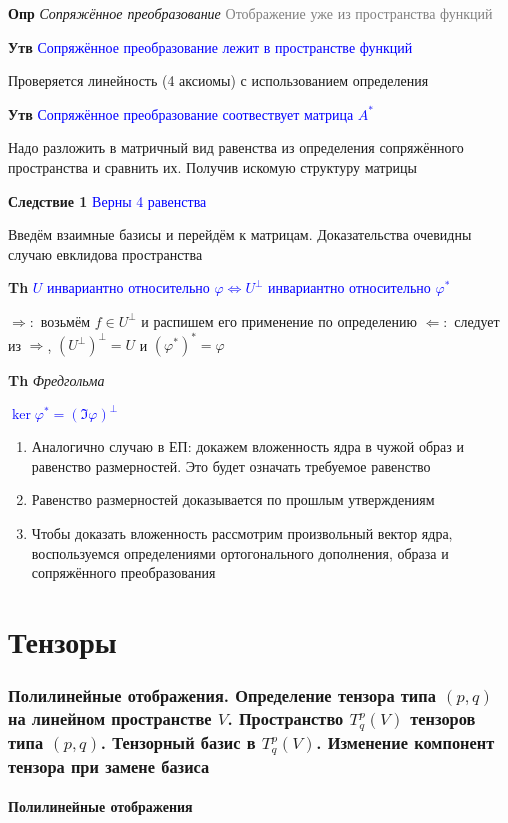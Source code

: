 \documentclass[a4paper, 14pt]{article}
\begin{document}
    \textbf{Опр} \textit{Сопряжённое преобразование} \textcolor{gray}{Отображение уже из пространства функций}
    
    \textbf{Утв} \textcolor{blue}{Сопряжённое преобразование лежит в пространстве функций}
    
    Проверяется линейность (4 аксиомы) с использованием определения
    
    \textbf{Утв} \textcolor{blue}{Сопряжённое преобразование соотвествует матрица $A^*$}
    
    Надо разложить в матричный вид равенства из определения сопряжённого пространства и сравнить их.
    Получив искомую структуру матрицы
    
    \textbf{Следствие 1} \textcolor{blue}{Верны 4 равенства}
    
    Введём взаимные базисы и перейдём к матрицам.
    Доказательства очевидны случаю евклидова пространства
    
    \textbf{Th} \textcolor{blue}{$U$ инвариантно относительно $\varphi \Leftrightarrow U^\bot$ инвариантно относительно $\varphi^*$}
    
    $\Rightarrow:$ возьмём $f \in U^\bot$ и распишем его применение по определению
    $\Leftarrow:$ следует из $\Rightarrow$, $(U^\bot)^\bot = U$ и $(\varphi^*)^* = \varphi$
    
    \textbf{Th} \textit{Фредгольма}
    
    \textcolor{blue}{$\ker \varphi^* = (\Im \varphi)^\bot$}
    
    \begin{enumerate}
        \item Аналогично случаю в ЕП: докажем вложенность ядра в чужой образ и равенство размерностей.
        Это будет означать требуемое равенство
        \item Равенство размерностей доказывается по прошлым утверждениям
        \item Чтобы доказать вложенность рассмотрим произвольный вектор ядра, воспользуемся определениями
        ортогонального дополнения, образа и сопряжённого преобразования
    \end{enumerate}
    
     \part*{Тензоры}
    
    \section{Полилинейные отображения.
    Определение тензора типа $(p,q)$ на линейном пространстве $V$.
    Пространство $T^p_q (V)$ тензоров типа $(p,q)$.
    Тензорный базис в $T^p_q (V)$.
    Изменение компонент тензора при замене базиса}
    
    \subsection{Полилинейные отображения}
\end{document}
